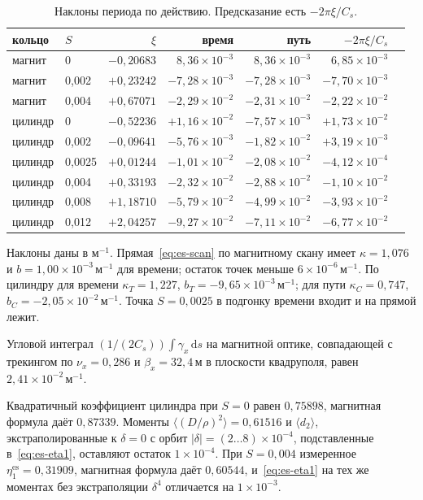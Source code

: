 \begin{table}[ht]
\centering
\caption{Наклоны периода по действию. Предсказание есть $-2\pi\xi/C_s$.}
\label{tab:es-scan}
\begin{tabular}{llrrrrr}
\hline
кольцо & $S$ & $\xi$ & время & путь & $-2\pi\xi/C_s$ \\
\hline
магнит & 0 & $-0{,}20683$ & $8{,}36\times 10^{-3}$ & $8{,}36\times 10^{-3}$ & $6{,}85\times 10^{-3}$ \\
магнит & 0{,}002 & $+0{,}23242$ & $-7{,}28\times 10^{-3}$ & $-7{,}28\times 10^{-3}$ & $-7{,}70\times 10^{-3}$ \\
магнит & 0{,}004 & $+0{,}67071$ & $-2{,}29\times 10^{-2}$ & $-2{,}31\times 10^{-2}$ & $-2{,}22\times 10^{-2}$ \\
цилиндр & 0 & $-0{,}52236$ & $+1{,}16\times 10^{-2}$ & $-7{,}57\times 10^{-3}$ & $+1{,}73\times 10^{-2}$ \\
цилиндр & 0{,}002 & $-0{,}09641$ & $-5{,}76\times 10^{-3}$ & $-1{,}82\times 10^{-2}$ & $+3{,}19\times 10^{-3}$ \\
цилиндр & 0{,}0025 & $+0{,}01244$ & $-1{,}01\times 10^{-2}$ & $-2{,}08\times 10^{-2}$ & $-4{,}12\times 10^{-4}$ \\
цилиндр & 0{,}004 & $+0{,}33193$ & $-2{,}32\times 10^{-2}$ & $-2{,}88\times 10^{-2}$ & $-1{,}10\times 10^{-2}$ \\
цилиндр & 0{,}008 & $+1{,}18710$ & $-5{,}79\times 10^{-2}$ & $-4{,}99\times 10^{-2}$ & $-3{,}93\times 10^{-2}$ \\
цилиндр & 0{,}012 & $+2{,}04257$ & $-9{,}27\times 10^{-2}$ & $-7{,}11\times 10^{-2}$ & $-6{,}77\times 10^{-2}$ \\
\hline
\end{tabular}
\end{table}

Наклоны даны в м$^{-1}$. Прямая~\eqref{eq:es-scan} по магнитному скану имеет $\kappa=1{,}076$ и $b=1{,}00\times 10^{-3}\,\mathrm{м}^{-1}$ для времени; остаток точек меньше $6\times 10^{-6}\,\mathrm{м}^{-1}$. По цилиндру для времени $\kappa_T=1{,}227$, $b_T=-9{,}65\times 10^{-3}\,\mathrm{м}^{-1}$; для пути $\kappa_C=0{,}747$, $b_C=-2{,}05\times 10^{-2}\,\mathrm{м}^{-1}$. Точка $S=0{,}0025$ в подгонку времени входит и на прямой лежит.

Угловой интеграл $(1/(2C_s))\int\gamma_x\,\mathrm{d}s$ на магнитной оптике, совпадающей с трекингом по $\nu_x=0{,}286$ и $\beta_x=32{,}4\,\mathrm{м}$ в плоскости квадруполя, равен $2{,}41\times 10^{-2}\,\mathrm{м}^{-1}$.

Квадратичный коэффициент цилиндра при $S=0$ равен $0{,}75898$, магнитная формула даёт $0{,}87339$. Моменты $\langle(D/\rho)^2\rangle=0{,}61516$ и $\langle d_2\rangle$, экстраполированные к $\delta=0$ с орбит $|\delta|=(2\ldots 8)\times 10^{-4}$, подставленные в~\eqref{eq:es-eta1}, оставляют остаток $1\times 10^{-4}$. При $S=0{,}004$ измеренное $\eta_1^{\mathrm{es}}=0{,}31909$, магнитная формула даёт $0{,}60544$, и~\eqref{eq:es-eta1} на тех же моментах без экстраполяции $\delta^4$ отличается на $1\times 10^{-3}$.
